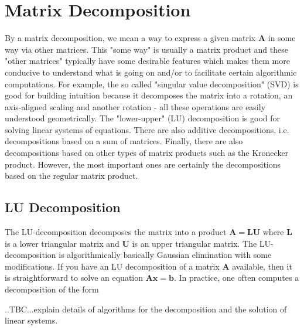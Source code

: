 \section{Matrix Decomposition}
By a matrix decomposition, we mean a way to express a given matrix $\mathbf{A}$ in some way via other matrices. This "some way" is usually a matrix product and these "other matrices" typically have some desirable features which makes them more conducive to understand what is going on and/or to facilitate certain algorithmic computations. For example, the so called "singular value decomposition" (SVD) is good for building intuition because it decomposes the matrix into a rotation, an axis-aligned scaling and another rotation - all these operations are easily understood geometrically. The "lower-upper" (LU) decomposition is good for solving linear systems of equations. There are also additive decompositions, i.e. decompositions based on a sum of matrices. Finally, there are also decompositions based on other types of matrix products such as the Kronecker product. However, the most important ones are certainly the decompositions based on the regular matrix product.



\subsection{LU Decomposition}
The LU-decomposition decomposes the matrix into a product $\mathbf{A = L U}$ where $\mathbf{L}$ is a lower triangular matrix and $\mathbf{U}$ is an upper triangular matrix. The LU-decomposition is algorithmically basically Gaussian elimination with some modifications. If you have an LU decomposition of a matrix $\mathbf{A}$ available, then it is straightforward to solve an equation $\mathbf{Ax = b}$. In practice, one often computes a decomposition of the form 

..TBC...explain details of algorithms for the decomposition and the solution of linear systems.




